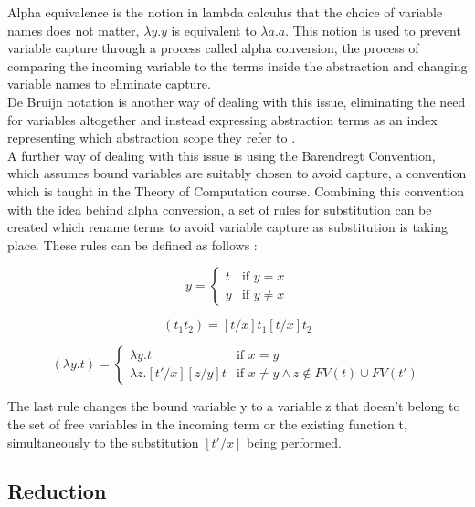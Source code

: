 \documentclass[a4paper,12pt]{report}
\begin{document}
Alpha equivalence is the notion in lambda calculus that the choice of variable names does not matter, $\lambda y.y$ is equivalent to $\lambda a.a$. This notion is used to prevent variable capture through a process called alpha conversion, the process of comparing the incoming variable to the terms inside the abstraction and changing variable names to eliminate capture.\\

De Bruijn notation is another way of dealing with this issue, eliminating the need for variables altogether and instead expressing abstraction terms as an index representing which abstraction scope they refer to \cite{Kamareddine2000}.\\

A further way of dealing with this issue is using the Barendregt Convention, which assumes bound variables are suitably chosen to avoid capture, a convention which is taught in the Theory of Computation course. Combining this convention with the idea behind alpha conversion, a set of rules for substitution can be created which rename terms to avoid variable capture as substitution is taking place. These rules can be defined as follows \cite{Acar2008}:

\begin{equation}
[t/x]y=\begin{cases}
t & \text{if $y=x$}\\
y & \text{if $y\ne x$}
\end{cases}
\end{equation}

\begin{equation}
[t/x](t_1t_2)=[t/x]t_1[t/x]t_2
\end{equation}

\begin{equation}
[t'/x](\lambda y.t)=\begin{cases}
\lambda y.t & \text{if $x=y$}\\
\lambda z.[t'/x][z/y]t & \text{if $x\ne y \land z\notin FV(t) \cup FV(t')$}
\end{cases}
\end{equation}

The last rule changes the bound variable y to a variable z that doesn’t belong to the set of free variables in the incoming term or the existing function t, simultaneously to the substitution $[t' / x]$ being performed.

\subsection{Reduction}
\end{document}
